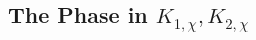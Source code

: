 \documentclass[
	fontsize=11pt, 
	twoside=false, 
	abstract=true, 
	a4paper,
]{scrartcl}
\newcommand{\RR}{\mathbb{R}}
\newcommand{\dd}{\mathrm{d}}
\newcommand{\del}{\partial}
\newcommand{\td}[1]{\tilde{#1}}
\begin{document}
%
%



\subsection{The Phase in $K_{1,\chi}, K_{2,\chi}$}%
\end{document}
